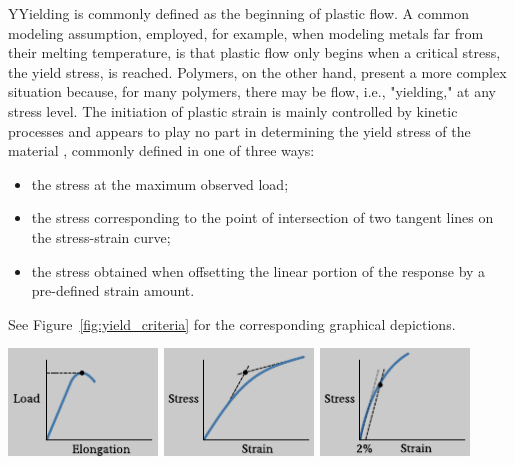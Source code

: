 \begin{remark}
YYielding is commonly defined as the beginning of plastic flow.
A common modeling assumption, employed, for example, when modeling metals far from their melting temperature, is that plastic flow only begins when a critical stress, the yield stress, is reached.
Polymers, on the other hand, present a more complex situation because, for many polymers, there may be flow, i.e., "yielding," at any stress level.
The initiation of plastic strain is mainly controlled by kinetic processes and appears to play no part in determining the yield stress of the material \citep{fotheringhamRoleRecoveryForces1978}, commonly defined in one of three ways: \citep{wardReviewYieldBehaviour1971}
	\begin{itemize}
		\item the stress at the maximum observed load;
		\item the stress corresponding to the point of intersection of two tangent lines on the stress-strain curve;
		\item the stress obtained when offsetting the linear portion of the response by a pre-defined strain amount.
	\end{itemize}
	See Figure~\ref{fig:yield_criteria} for the corresponding graphical depictions.
	\begin{center}
			\centering
								\includegraphics[width=0.3\textwidth]{figures/yield_criterion_a}
				\hfill
							\includegraphics[width=0.3\textwidth]{figures/yield_criterion_b}
			\hfill
								\includegraphics[width=0.3\textwidth]{figures/yield_criterion_c}
		\label{fig:yield_criteria}
	\end{center}
\label{rmrk:yield_polymer}
\end{remark}

